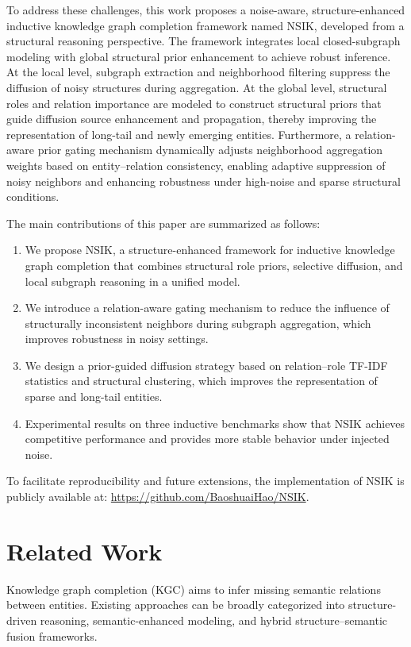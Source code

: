 \documentclass[preprint,12pt]{elsarticle}
\begin{document}
To address these challenges, this work proposes a noise-aware, structure-enhanced inductive knowledge graph completion framework named NSIK, developed from a structural reasoning perspective. The framework integrates local closed-subgraph modeling with global structural prior enhancement to achieve robust inference. At the local level, subgraph extraction and neighborhood filtering suppress the diffusion of noisy structures during aggregation. At the global level, structural roles and relation importance are modeled to construct structural priors that guide diffusion source enhancement and propagation, thereby improving the representation of long-tail and newly emerging entities. Furthermore, a relation-aware prior gating mechanism dynamically adjusts neighborhood aggregation weights based on entity–relation consistency, enabling adaptive suppression of noisy neighbors and enhancing robustness under high-noise and sparse structural conditions.

The main contributions of this paper are summarized as follows:

\begin{enumerate}
    \item We propose NSIK, a structure-enhanced framework for inductive knowledge graph completion that combines structural role priors, selective diffusion, and local subgraph reasoning in a unified model.
    \item We introduce a relation-aware gating mechanism to reduce the influence of structurally inconsistent neighbors during subgraph aggregation, which improves robustness in noisy settings.
    \item We design a prior-guided diffusion strategy based on relation--role TF-IDF statistics and structural clustering, which improves the representation of sparse and long-tail entities.
    \item Experimental results on three inductive benchmarks show that NSIK achieves competitive performance and provides more stable behavior under injected noise.
\end{enumerate}

To facilitate reproducibility and future extensions, the implementation of NSIK is publicly available at: \url{https://github.com/BaoshuaiHao/NSIK}.
\section{Related Work}

Knowledge graph completion (KGC) aims to infer missing semantic relations between entities. Existing approaches can be broadly categorized into structure-driven reasoning, semantic-enhanced modeling, and hybrid structure–semantic fusion frameworks.
\end{document}
